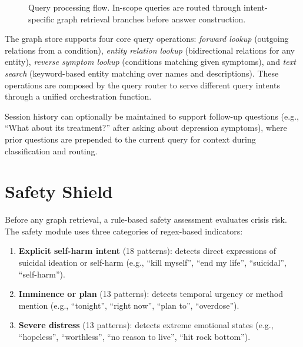 \documentclass[12pt,a4paper]{article}
\begin{document}
\begin{figure}[ht]
\centering
{}
\caption{Query processing flow. In-scope queries are routed through intent-specific graph retrieval branches before answer construction.}
\label{fig:query_flow}
\end{figure}

The graph store supports four core query operations: \textit{forward lookup} (outgoing relations from a condition), \textit{entity relation lookup} (bidirectional relations for any entity), \textit{reverse symptom lookup} (conditions matching given symptoms), and \textit{text search} (keyword-based entity matching over names and descriptions). These operations are composed by the query router to serve different query intents through a unified orchestration function.

Session history can optionally be maintained to support follow-up questions (e.g., ``What about its treatment?'' after asking about depression symptoms), where prior questions are prepended to the current query for context during classification and routing.

\section{Safety Shield}

Before any graph retrieval, a rule-based safety assessment evaluates crisis risk. The safety module uses three categories of regex-based indicators:

\begin{enumerate}[nosep]
    \item \textbf{Explicit self-harm intent} (18 patterns): detects direct expressions of suicidal ideation or self-harm (e.g., ``kill myself'', ``end my life'', ``suicidal'', ``self-harm'').
    \item \textbf{Imminence or plan} (13 patterns): detects temporal urgency or method mention (e.g., ``tonight'', ``right now'', ``plan to'', ``overdose'').
    \item \textbf{Severe distress} (13 patterns): detects extreme emotional states (e.g., ``hopeless'', ``worthless'', ``no reason to live'', ``hit rock bottom'').
\end{enumerate}
\end{document}
